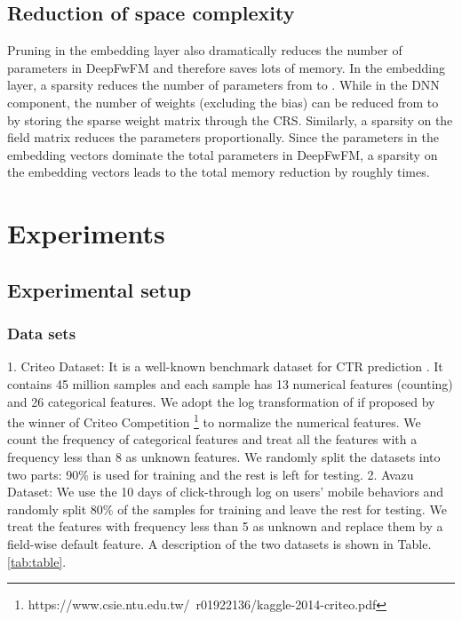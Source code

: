 \documentclass[sigconf]{acmart}
\begin{document}
\subsection{Reduction of space complexity} 

Pruning in the embedding layer also dramatically reduces the number of parameters in DeepFwFM and therefore saves lots of memory. In the embedding layer, a  sparsity reduces the number of parameters from  to . While in the DNN component, the number of weights (excluding the bias) can be reduced from  to  by storing the sparse weight matrix through the CRS. Similarly, a  sparsity on the field matrix  reduces the parameters proportionally. Since the parameters in the embedding vectors dominate the total parameters in DeepFwFM, a  sparsity on the embedding vectors leads to the total memory reduction by roughly  times.





\section{Experiments}

\subsection{Experimental setup}
\subsubsection{Data sets}

1. Criteo Dataset: It is a well-known benchmark dataset for CTR prediction \cite{criteo}. It contains 45 million samples and each sample has 13 numerical features (counting) and 26 categorical features. We adopt the log transformation of  if  proposed by the winner of Criteo Competition \footnote{https://www.csie.ntu.edu.tw/~r01922136/kaggle-2014-criteo.pdf} to normalize the numerical features. We count the frequency of categorical features and treat all the features with a frequency less than 8 as unknown features. We randomly split the datasets into two parts: 90\% is used for training and the rest is left for testing. 2. Avazu Dataset: We use the 10 days of click-through log on users' mobile behaviors and randomly split 80\% of the samples for training and leave the rest for testing. We treat the features with frequency less than 5 as unknown and replace them by a field-wise default feature. A description of the two datasets is shown in Table.\ref{tab:table}. 
\end{document}
